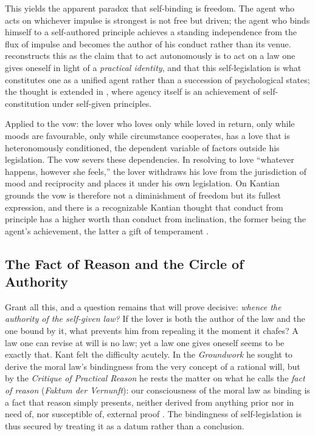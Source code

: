 This yields the apparent paradox that self-binding is freedom. The agent who acts on whichever impulse is strongest is not free but driven; the agent who binds himself to a self-authored principle achieves a standing independence from the flux of impulse and becomes the author of his conduct rather than its venue. \textcite{korsgaard1996sources} reconstructs this as the claim that to act autonomously is to act on a law one gives oneself in light of a \emph{practical identity}, and that this self-legislation is what constitutes one as a unified agent rather than a succession of psychological states; the thought is extended in \textcite{korsgaard2009self}, where agency itself is an achievement of self-constitution under self-given principles.

Applied to the vow: the lover who loves only while loved in return, only while moods are favourable, only while circumstance cooperates, has a love that is heteronomously conditioned, the dependent variable of factors outside his legislation. The vow severs these dependencies. In resolving to love ``whatever happens, however she feels,'' the lover withdraws his love from the jurisdiction of mood and reciprocity and places it under his own legislation. On Kantian grounds the vow is therefore not a diminishment of freedom but its fullest expression, and there is a recognizable Kantian thought that conduct from principle has a higher worth than conduct from inclination, the former being the agent's achievement, the latter a gift of temperament \parencite[4:398--399]{kant1785groundwork}.

\subsection{The Fact of Reason and the Circle of Authority}

Grant all this, and a question remains that will prove decisive: \emph{whence the authority of the self-given law?} If the lover is both the author of the law and the one bound by it, what prevents him from repealing it the moment it chafes? A law one can revise at will is no law; yet a law one gives oneself seems to be exactly that. Kant felt the difficulty acutely. In the \emph{Groundwork} he sought to derive the moral law's bindingness from the very concept of a rational will, but by the \emph{Critique of Practical Reason} he rests the matter on what he calls the \emph{fact of reason} (\emph{Faktum der Vernunft}): our consciousness of the moral law as binding is a fact that reason simply presents, neither derived from anything prior nor in need of, nor susceptible of, external proof \parencite[5:31]{kant1788practical}. The bindingness of self-legislation is thus secured by treating it as a datum rather than a conclusion.

